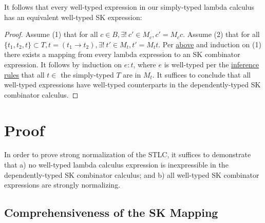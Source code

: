 \documentclass[11pt]{article}
\begin{document}
It follows that every well-typed expression in our simply-typed lambda calculus has an equivalent well-typed SK expression:

\begin{proof}
Assume (1) that for all $c \in B, \exists!\ c' \in M_{c}, c' = M_{c} c$.
Assume (2) that for all $\{t_{1}, t_{2}, t\} \subset T, t = (t_{1} \rightarrow t_{2}), \exists!\ t' \in M_{t}, t' = M_{t} t$.
Per \href{decomplemma:1}{above} and induction on (1) there exists a mapping from every lambda expression to an SK combinator expression.
It follows by induction on $e : t$, where $e$ is well-typed per the \href{decomplemma:1}{inference rules} that all $t \in$ the simply-typed $T$ are in $M_{t}$.
It suffices to conclude that all well-typed expressions have well-typed counterparts in the dependently-typed SK combinator calculus.
\end{proof}
\section{Proof}
\label{sec:orgacdc073}

In order to prove strong normalization of the STLC, it suffices to demonstrate that a) no well-typed lambda calculus expression is inexpressible in the dependently-typed SK combinator calculus; and b) all well-typed SK combinator expressions are strongly normalizing.
\subsection{Comprehensiveness of the SK Mapping}
\label{sec:org85407ac}
\end{document}
